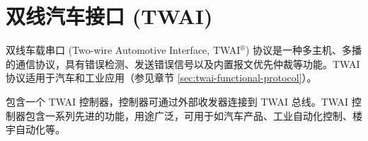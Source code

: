 \documentclass[main\_\_CN.tex]{subfiles}
\begin{document}

\ifglobal
\else
    {\let\clearpage\relax \listoftodos}
    \tableofcontents
\fi




\hypertarget{twai}{}
\chapter{双线汽车接口 (TWAI)}
\label{mod:twai}

双线车载串口 (Two-wire Automotive Interface, TWAI$^\circledR$) 协议是一种多主机、多播的通信协议，具有错误检测、发送错误信号以及内置报文优先仲裁等功能。TWAI 协议适用于汽车和工业应用（参见章节 \ref{sec:twai-functional-protocol}）。

\chipname{} 包含一个 TWAI 控制器，控制器可通过外部收发器连接到 TWAI 总线。TWAI 控制器包含一系列先进的功能，用途广泛，可用于如汽车产品、工业自动化控制、楼宇自动化等。
\end{document}
